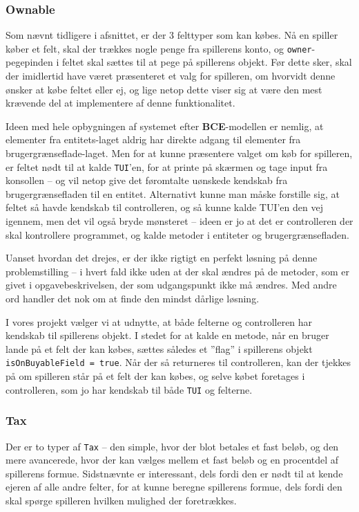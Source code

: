 \subsubsection{Ownable}
Som nævnt tidligere i afsnittet, er der 3 felttyper som kan købes. Nå en spiller køber et felt, skal der trækkes nogle penge fra spillerens konto, og \texttt{owner}-pegepinden i feltet skal sættes til at pege på spillerens objekt. Før dette sker, skal der imidlertid have været præsenteret et valg for spilleren, om hvorvidt denne ønsker at købe feltet eller ej, og lige netop dette viser sig at være den mest krævende del at implementere af denne funktionalitet.


Ideen med hele opbygningen af systemet efter \textbf{BCE}-modellen er nemlig, at elementer fra entitets-laget aldrig har direkte adgang til elementer fra brugergrænseflade-laget. Men for at kunne præsentere valget om køb for spilleren, er feltet nødt til at kalde \texttt{TUI}’en, for at printe på skærmen og tage input fra konsollen – og vil netop give det føromtalte uønskede kendskab fra brugergrænsefladen til en entitet. Alternativt kunne man måske forstille sig, at feltet så havde kendskab til controlleren, og så kunne kalde TUI’en den vej igennem, men det vil også bryde mønsteret – ideen er jo at det er controlleren der skal kontrollere programmet, og kalde metoder i entiteter og brugergrænsefladen.


Uanset hvordan det drejes, er der ikke rigtigt en perfekt løsning på denne problemstilling – i hvert fald ikke uden at der skal ændres på de metoder, som er givet i opgavebeskrivelsen, der som udgangspunkt ikke må ændres. Med andre ord handler det nok om at finde den mindst dårlige løsning.


I vores projekt vælger vi at udnytte, at både felterne og controlleren har kendskab til spillerens objekt. I stedet for at kalde en metode, når en bruger lande på et felt der kan købes, sættes således et ”flag” i spillerens objekt \texttt{isOnBuyableField = true}. Når der så returneres til controlleren, kan der tjekkes på om spilleren står på et felt der kan købes, og selve købet foretages i controlleren, som jo har kendskab til både \texttt{TUI} og felterne.
\subsubsection{Tax}
Der er to typer af \texttt{Tax} – den simple, hvor der blot betales et fast beløb, og den mere avancerede, hvor der kan vælges mellem et fast beløb og en procentdel af spillerens formue. Sidstnævnte er interessant, dels fordi den er nødt til at kende ejeren af alle andre felter, for at kunne beregne spillerens formue, dels fordi den skal spørge spilleren hvilken mulighed der foretrækkes.

